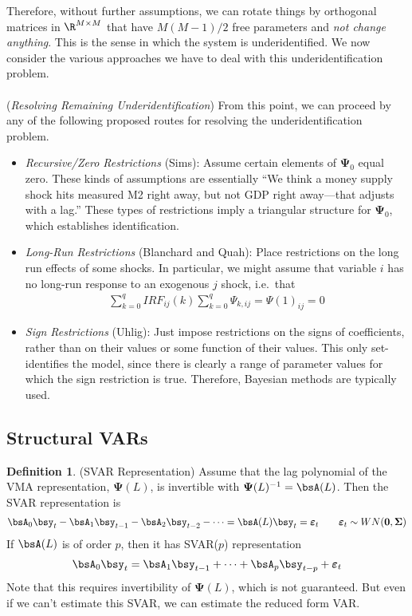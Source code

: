 \documentclass[12pt]{article}
\theoremstyle{plain}
\theoremstyle{definition}
\newtheorem{defn}[thm]{Definition}
\theoremstyle{remark}
\newcommand{\bsSigma}{\boldsymbol{\Sigma}}
\newcommand{\bsvarepsilon}{\boldsymbol{\varepsilon}}
\newcommand{\bsPsi}{\boldsymbol{\Psi}}
\renewcommand{\bso}{\boldsymbol{0}}
\begin{document}
Therefore, without further assumptions, we can rotate things by
orthogonal matrices in $\R^{M\times M}$ that have $M(M-1)/2$ free
parameters and \emph{not change anything}. This is the sense in which
the system is underidentified. We now consider the various approaches we
have to deal with this underidentification problem.
\\
\\
(\emph{Resolving Remaining Underidentification})
From this point, we can proceed by any of the following proposed routes
for resolving the underidentification problem.
\begin{itemize}
  \item \emph{Recursive/Zero Restrictions} (Sims):
    Assume certain elements of $\bsPsi_0$ equal zero. These kinds of
    assumptions are essentially ``We think a money supply shock hits
    measured M2 right away, but not GDP right away---that adjusts with a
    lag.'' These types of restrictions imply a triangular structure for
    $\bsPsi_0$, which establishes identification.
  \item \emph{Long-Run Restrictions} (Blanchard and Quah): Place
    restrictions on the long run effects of some shocks. In particular,
    we might assume that variable $i$ has no long-run response to an
    exogenous $j$ shock, i.e.\ that
    \begin{align*}
      \sum_{k=0}^q IRF_{ij}(k)
      \sum_{k=0}^q \Psi_{k,ij}
      = \Psi(1)_{ij}
      = 0
    \end{align*}
  \item \emph{Sign Restrictions} (Uhlig): Just impose restrictions on
    the signs of coefficients, rather than on their values or some
    function of their values. This only set-identifies the model, since
    there is clearly a range of parameter values for which the sign
    restriction is true. Therefore, Bayesian methods are typically used.
\end{itemize}


\clearpage
\subsection{Structural VARs}

\begin{defn}(SVAR Representation)
Assume that the lag polynomial of the VMA representation, $\bsPsi(L)$,
is invertible with $\bsPsi(L)^{-1}=\bsA(L)$. Then the SVAR
representation is
\begin{align*}
  \bsA_0\bsy_t
  - \bsA_1\bsy_{t-1}
  - \bsA_2\bsy_{t-2}
  - \cdots
  = \bsA(L)\bsy_t
  = \bsvarepsilon_t
  \qquad \bsvarepsilon_t \sim WN(\bso,\bsSigma)
\end{align*}
If $\bsA(L)$ is of order $p$, then it has SVAR($p$) representation
\begin{align}
  \bsA_0\bsy_t
  =
  \bsA_1\bsy_{t-1}
  + \cdots
  + \bsA_p\bsy_{t-p}
  + \bsvarepsilon_t
  \label{svarp}
\end{align}
Note that this requires invertibility of $\bsPsi(L)$, which is not
guaranteed. But even if we can't estimate this SVAR, we can estimate
the reduced form VAR.
\end{defn}
\end{document}
